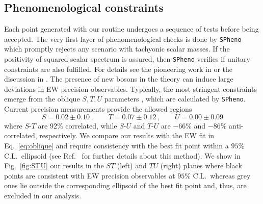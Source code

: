 \documentclass[a4paper,11pt]{article}
\renewcommand{\(}{\left(}
\renewcommand{\)}{\right)}
\renewcommand{\[}{\left[}
\renewcommand{\]}{\right]}
\begin{document}
\subsection{Phenomenological constraints}

Each point generated with our routine undergoes a sequence of tests before being accepted. The very first layer of phenomenological checks is done by \texttt{SPheno} which promptly rejects any scenario with tachyonic scalar masses. If the positivity of squared scalar spectrum is assured, then \texttt{SPheno} verifies if unitary constraints are also fulfilled. For details see the pioneering work in \cite{Lee:1977eg} or the discussion in \cite{Coimbra:2013qq}. The presence of new bosons in the theory can induce large deviations in EW precision observables. Typically, the most stringent constraints emerge from the oblique $S,T,U$ parameters \cite{Kennedy:1988sn,Peskin:1990zt,Maksymyk:1993zm}, which are calculated by \texttt{SPheno}. Current precision measurements \cite{Tanabashi:2018oca} provide the allowed regions 
\begin{equation}
	S = 0.02 \pm 0.10\,, \qquad T = 0.07 \pm 0.12\,, \qquad U = 0.00 \pm 0.09
	\label{eq:oblique}
\end{equation}
where $S$-$T$ are $92\%$ correlated, while $S$-$U$ and $T$-$U$ are $-66\%$ and $-86\%$ anti-correlated, respectively. We compare our results with the EW fit in Eq.~\eqref{eq:oblique} and require consistency with the best fit point within a $95\%$ C.L.~ellipsoid (see Ref.~\cite{Costa:2014qga} for further details about this method). We show in Fig.~\ref{fig:STU} our results in the $ST$ (left) and $TU$ (right) planes where black points are consistent with EW precision observables at $95\%$ C.L.~whereas grey ones lie outside the corresponding ellipsoid of the best fit point and, thus, are excluded in our analysis. 
\end{document}
